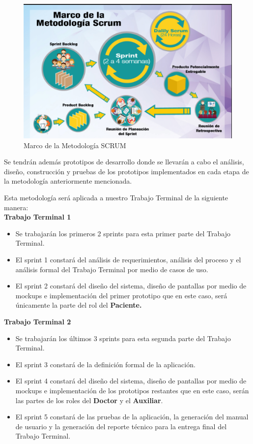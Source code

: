 \begin{figure}[htb]
	\centering
	\includegraphics[width=1\textwidth]{images/introduccion/scrum}
	\caption{Marco de la Metodología SCRUM} \label{fig:metodologiaSCRUM}
\end{figure}

Se tendrán además prototipos de desarrollo donde se llevarán a cabo el análisis, diseño, construcción y pruebas de los prototipos implementados en cada etapa de la metodología anteriormente mencionada.

Esta metodología será aplicada a nuestro Trabajo Terminal de la siguiente manera:\\

\textbf{Trabajo Terminal 1}
\begin{itemize}
	\item Se trabajarán los primeros 2 sprints para esta primer parte del Trabajo Terminal.
	\item El sprint 1 constará del análisis de requerimientos, análisis del proceso y el análisis formal del Trabajo Terminal por medio de casos de uso.
	\item El sprint 2 constará del diseño del sistema, diseño de pantallas por medio de mockups e implementación del primer prototipo que en este caso, será únicamente la parte del rol del \textbf{Paciente.}
\end{itemize}

\textbf{Trabajo Terminal 2}
\begin{itemize}
	\item Se trabajarán los últimos 3 sprints para esta segunda parte del Trabajo Terminal.
	\item El sprint 3 constará de la definición formal de la aplicación.
	\item El sprint 4 constará del diseño del sistema, diseño de pantallas por medio de mockups e implementación de los prototipos restantes que en este caso, serán las partes de los roles del \textbf{Doctor} y el \textbf{Auxiliar}.
	\item El sprint 5 constará de las pruebas de la aplicación, la generación del manual de usuario y la generación del reporte técnico para la entrega final del Trabajo Terminal.
\end{itemize}



